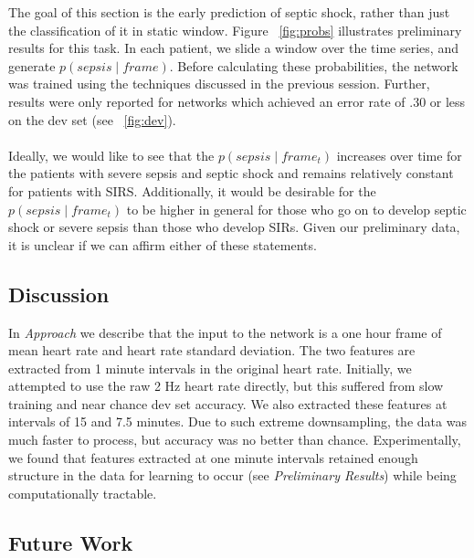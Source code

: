 \documentclass[12pt,solutions]{article}
\begin{document}
The goal of this section is the early prediction of septic shock, rather than just the classification of it in static window. Figure ~\ref{fig:probs}
illustrates preliminary results for this task. In each patient, we slide a window over the time series, and generate $p(sepsis \mid frame)$. Before calculating these probabilities, the network was trained using the techniques discussed in the previous session. Further, results were
only reported for networks which achieved an error rate of .30 or less on the dev set (see ~\ref{fig:dev}). 
\\
\\
Ideally, we would like to see that the $p(sepsis \mid frame_{t})$ increases over time for the patients with severe sepsis and septic shock
and remains relatively constant for patients with SIRS. Additionally, it would be desirable for the $p(sepsis \mid frame_{t})$ to be 
higher in general for those who go on to develop septic shock or severe sepsis than those who develop SIRs. Given our preliminary
data, it is unclear if we can affirm either of these statements.   

\subsection{Discussion}

In \textit{Approach} we describe that the input to the network is a one hour frame of mean heart rate and heart rate standard deviation.
The two features are extracted from 1 minute intervals in the original heart rate. Initially, we attempted to use the raw 2 Hz heart rate directly,
but this suffered from slow training and near chance dev set accuracy. We also extracted these features at intervals of 
15 and 7.5 minutes. Due to such extreme downsampling, the data was much faster to process, but accuracy was no better than chance. Experimentally, we found that features extracted at one minute intervals retained enough structure in the data for learning to occur (see \textit{Preliminary Results}) while being computationally tractable.
 
\subsection{Future Work}
\end{document}
